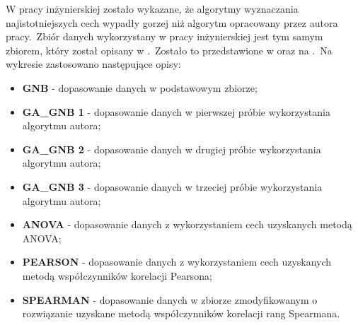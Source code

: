 W pracy inżynierskiej zostało wykazane, że algorytmy wyznaczania najistotniejszych cech wypadły gorzej niż algorytm opracowany przez autora pracy.\ Zbiór danych wykorzystany w pracy inżynierskiej jest tym samym zbiorem, który został opisany w .\ Zostało to przedstawione w  oraz na .\ Na wykresie zastosowano następujące opisy:
\begin{itemize}
    \item \textbf{GNB} - dopasowanie danych w podstawowym zbiorze;
    \item \textbf{GA\_GNB 1} - dopasowanie danych w pierwszej próbie wykorzystania algorytmu autora;
    \item \textbf{GA\_GNB 2} - dopasowanie danych w drugiej próbie wykorzystania algorytmu autora;
    \item \textbf{GA\_GNB 3} - dopasowanie danych w trzeciej próbie wykorzystania algorytmu autora;
    \item \textbf{ANOVA} - dopasowanie danych z wykorzystaniem cech uzyskanych metodą ANOVA;
    \item \textbf{PEARSON} - dopasowanie danych z wykorzystaniem cech uzyskanych metodą współczynników korelacji Pearsona;
    \item \textbf{SPEARMAN} - dopasowanie danych w zbiorze zmodyfikowanym o rozwiązanie uzyskane metodą  współczynników korelacji rang Spearmana.
\end{itemize}
\vfill
\clearpage
